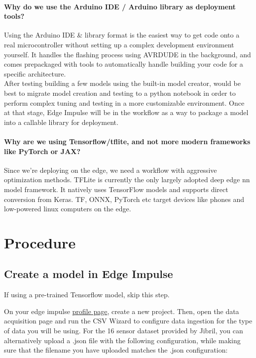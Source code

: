 \documentclass{article}
\begin{document}
\paragraph{Why do we use the Arduino IDE / Arduino library as deployment tools?}
Using the Arduino IDE \& library format is the easiest way to get code onto a real microcontroller without setting up a complex development environment yourself. It handles the flashing process using AVRDUDE in the background, and comes prepackaged with tools to automatically handle building your code for a specific architecture.\\

After testing building a few models using the built-in model creator, would be best to migrate model creation and testing to a python notebook in order to perform complex tuning and testing in a more customizable environment. Once at that stage, Edge Impulse will be in the workflow as a way to package a model into a callable library for deployment. 

\paragraph{Why are we using Tensorflow/tflite, and not more modern frameworks like PyTorch or JAX?} Since we're deploying on the edge, we need a workflow with aggressive optimization methods. TFLite is currently the only largely adopted deep edge nn model framework. It natively uses TensorFlow models and supports direct conversion from Keras. TF, ONNX, PyTorch etc target devices like phones and low-powered linux computers on the edge. 

\section{Procedure}

\subsection{Create a model in Edge Impulse}

If using a pre-trained Tensorflow model, skip this step.

On your edge impulse \href{https://studio.edgeimpulse.com/}{profile page}, create a new project. Then, open the data acquisition page and run the CSV Wizard to configure data ingestion for the type of data you will be using. For the 16 sensor dataset provided by Jibril, you can alternatively upload a .json file with the following configuration, while making sure that the filename you have uploaded matches the .json configuration:\\
\end{document}
